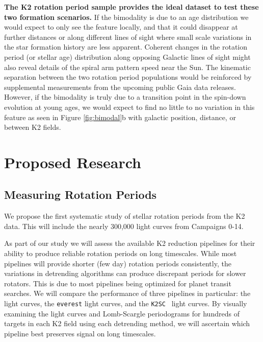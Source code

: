 \documentclass[12pt]{article}
\newcommand{\ktwosc}{{\tt K2SC}}
\begin{document}
{\bf The K2 rotation period sample provides the ideal dataset to test these two formation scenarios.} If the bimodality is due to an age distribution we would expect to only see the feature locally, and that it could disappear at further distances or along different lines of sight where small scale variations in the star formation history are less apparent. Coherent changes in the rotation period (or stellar age) distribution along opposing Galactic lines of sight might also reveal details of the spiral arm pattern speed near the Sun. The kinematic separation between the two rotation period populations would be reinforced by supplemental measurements from the upcoming public Gaia data releases. However, if the bimodality is truly due to a transition point in the spin-down evolution at young ages, we would expect to find no little to no variation in this feature as seen in Figure \ref{fig:bimodal}b with galactic position, distance, or between K2 fields.





\section{Proposed Research}
\subsection{Measuring Rotation Periods}
We propose the first systematic study of stellar rotation periods from the K2
data. This will include the nearly 300,000 light curves from Campaigns 0-14.


As part of our study we will assess the available K2 reduction pipelines for their ability to produce reliable rotation periods on long timescales. While most pipelines will provide shorter (few day) rotation periods consistently, the variations in detrending algorithms can produce discrepant periods for slower rotators. This is due to most pipelines being optimized for planet transit searches. We will compare the performance of three pipelines in particular: the
\citet{Vanderburg2015} light curves, the {\tt everest} \citet{luger2016} light
curves, and the \ktwosc\ \citet{aigrain2016} light curves.
By visually examining the light curves and Lomb-Scargle periodograms for hundreds of targets in each K2 field using each detrending method, we will ascertain
which pipeline best preserves signal on long timescales.
\end{document}
